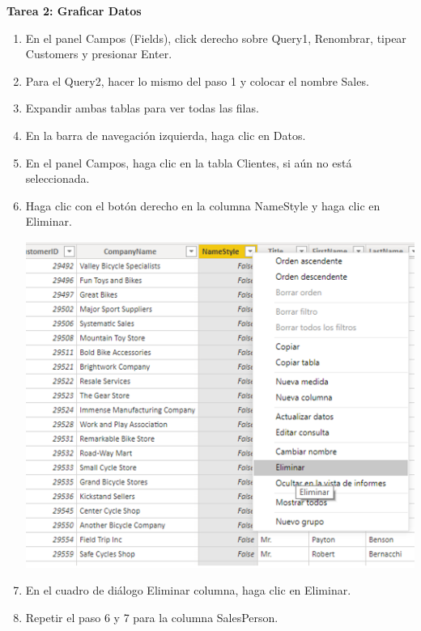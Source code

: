 \begin{itemize}
\textbf{Tarea 2: Graficar Datos}
\end{itemize}

\begin{enumerate}
	\item En el panel Campos (Fields), click derecho sobre Query1, Renombrar, tipear Customers y presionar Enter.
	
    \item Para el Query2, hacer lo mismo del paso 1 y colocar el nombre Sales.
    \item Expandir ambas tablas para ver todas las filas.
    
  
    \item  En la barra de navegación izquierda, haga clic en Datos.
  
    \item En el panel Campos, haga clic en la tabla Clientes, si aún no está seleccionada.
    
    \item Haga clic con el botón derecho en la columna NameStyle y haga clic en Eliminar.

    \begin{center}
	\includegraphics[width=13cm]{./Imagenes/4}
	\end{center}
    \item En el cuadro de diálogo Eliminar columna, haga clic en Eliminar.

    \item Repetir el paso 6 y 7 para la columna SalesPerson.
    

\end{enumerate}

